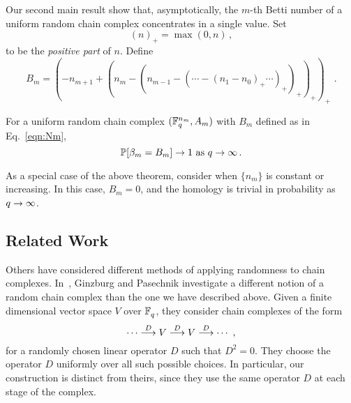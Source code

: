 Our second main result show that, asymptotically, the $m$-th Betti number of a uniform random chain complex concentrates in a single value. Set
\begin{equation*}
  (n)_+ = \max(0,n) \, , %
\end{equation*}
to be the {\em positive part} of $n$.
Define
\begin{equation}
  B_m = (-n_{m+1} + (n_m - (n_{m-1} - (\cdots - (n_1 - n_0)_+ \cdots)_+ )_+
  )_+)_+ \, \, .
  \label{eqn:Nm}
\end{equation}

\begin{bigthm}
  \label{thm:qtoinfty}
  For a uniform random chain complex $(\mathbb{F}_q^{n_m},A_m)$ with $B_m$ defined as in Eq.~\eqref{eqn:Nm},
  \[
    \mathbb{P}[\beta_m = B_m] \rightarrow 1 
    \mbox{ as } q \rightarrow \infty  \, .
  \]
\end{bigthm}


\begin{remark}
  \label{rem:monotone}
  As a special case of the above theorem, consider when $\{n_m\}$
  is constant or increasing. In this case, 
  $B_m = 0$, and the homology is trivial in probability as $q \rightarrow \infty$.    
\end{remark}

\subsection*{Related Work} Others have considered different methods of applying
randomness to chain complexes. In~\cite{ginzburg2017random}, Ginzburg and
Pasechnik investigate
a different 
notion of a random chain
complex than the one we have described above.  Given a finite dimensional vector space
$V$ over $\mathbb{F}_q^{}$, they consider chain complexes of the form \[ \cdots
\stackrel{D}{\longrightarrow} V \stackrel{D}{\longrightarrow} V \stackrel{D}{\longrightarrow} \cdots \, \, , \]
for a randomly chosen linear operator $D$ such that $D^2 = 0$. They choose the
operator $D$ uniformly over all such possible choices. In particular, our construction
is distinct from theirs, since they use the same operator $D$
at each stage of the complex.

